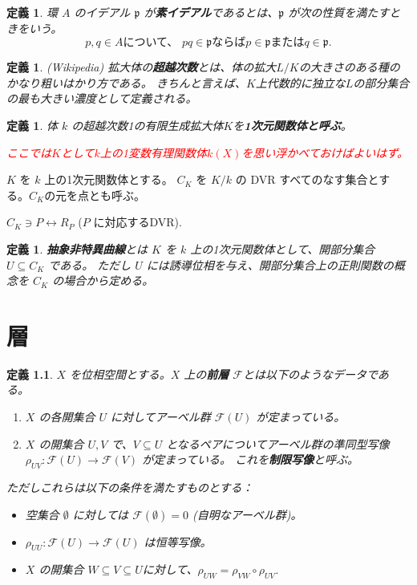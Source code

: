 \documentclass[uplatex, 12pt]{jsreport}
\newtheorem{dfn}[thm]{定義}
\newcommand{\mfp}{\mathfrak{p}}
\newcommand{\mcF}{\mathcal{F}}
\begin{document}
\begin{dfn}
    環 $A$ のイデアル $\mfp$ が\textbf{素イデアル}であるとは、$\mfp$ が次の性質を満たすときをいう。
    \[
        p, q \in A \text{について、\ } pq \in \mfp \text{ならば} p \in \mfp \text{または} q \in \mfp.
    \]
\end{dfn}

\begin{dfn}
    (Wikipedia) 拡大体の{\bf 超越次数}とは、体の拡大$L/K$の大きさのある種のかなり粗いはかり方である。
    きちんと言えば、$K$上代数的に独立な$L$の部分集合の最も大きい濃度として定義される。
\end{dfn}

\begin{dfn}
体 $k$ の超越次数1の有限生成拡大体$K$を{\bf 1次元関数体と呼ぶ}。

\textcolor{red}{ここでは$K$として$k$上の1変数有理関数体$k(X)$を思い浮かべておけばよいはず。}
\end{dfn}

$K$ を $k$ 上の1次元関数体とする。
$C_K$ を $K/k$ の DVR すべてのなす集合とする。$C_K$の元を点とも呼ぶ。
\begin{center}
    $C_K \ni P \leftrightarrow R_P$ ($P$ に対応するDVR).
\end{center}

\begin{dfn}
    {\bf 抽象非特異曲線}とは $K$ を $k$ 上の1次元関数体として、開部分集合 $U \subseteq C_K$ である。
    ただし $U$ には誘導位相を与え、開部分集合上の正則関数の概念を $C_K$ の場合から定める。
\end{dfn}

\chapter{層}

\begin{dfn}
    $X$ を位相空間とする。$X$ 上の\textbf{前層} $\mcF$とは以下のようなデータである。
    \begin{enumerate}
        \item $X$ の各開集合 $U$ に対してアーベル群 $\mcF(U)$ が定まっている。
        \item $X$ の開集合 $U, V$ で、$V \subseteq U$ となるペアについてアーベル群の準同型写像
        $\rho_{UV}: \mcF(U) \to \mcF(V)$ が定まっている。 これを\textbf{制限写像}と呼ぶ。
    \end{enumerate}
    ただしこれらは以下の条件を満たすものとする：
    \begin{itemize}
        \item 空集合 $\emptyset$ に対しては $\mcF(\emptyset) = 0$ (自明なアーベル群)。
        \item $\rho_{UU}: \mcF(U) \to \mcF(U)$ は恒等写像。
        \item $X$ の開集合 $W \subseteq V \subseteq U$に対して、$\rho_{UW} = \rho_{VW}\circ\rho_{UV}$.
    \end{itemize}
\end{dfn}
\end{document}
